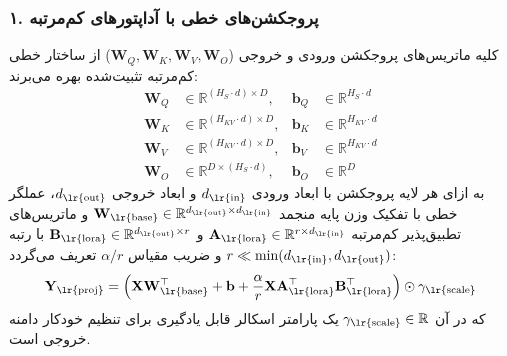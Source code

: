\subsubsection*{۱. پروجکشن‌های خطی با آداپتورهای کم‌مرتبه }
کلیه ماتریس‌های پروجکشن ورودی و خروجی ($\mathbf{W}_Q, \mathbf{W}_K, \mathbf{W}_V, \mathbf{W}_O$) از ساختار خطی کم‌مرتبه تثبیت‌شده بهره می‌برند:
\begin{align}
\mathbf{W}_Q &\in \mathbb{R}^{(H_S \cdot d) \times D}, & \mathbf{b}_Q &\in \mathbb{R}^{H_S \cdot d} \\
\mathbf{W}_K &\in \mathbb{R}^{(H_{KV} \cdot d) \times D}, & \mathbf{b}_K &\in \mathbb{R}^{H_{KV} \cdot d} \\
\mathbf{W}_V &\in \mathbb{R}^{(H_{KV} \cdot d) \times D}, & \mathbf{b}_V &\in \mathbb{R}^{H_{KV} \cdot d} \\
\mathbf{W}_O &\in \mathbb{R}^{D \times (H_S \cdot d)}, & \mathbf{b}_O &\in \mathbb{R}^{D}
\end{align}
به ازای هر لایه پروجکشن با ابعاد ورودی $d_{\text{\lr{in}}}$ و ابعاد خروجی $d_{\text{\lr{out}}}$، عملگر خطی با تفکیک وزن پایه منجمد $\mathbf{W}_{\text{\lr{base}}} \in \mathbb{R}^{d_{\text{\lr{out}}} \times d_{\text{\lr{in}}}}$ و ماتریس‌های تطبیق‌پذیر کم‌مرتبه $\mathbf{A}_{\text{\lr{lora}}} \in \mathbb{R}^{r \times d_{\text{\lr{in}}}}$ و $\mathbf{B}_{\text{\lr{lora}}} \in \mathbb{R}^{d_{\text{\lr{out}}} \times r}$ با رتبه $r \ll \min(d_{\text{\lr{in}}}, d_{\text{\lr{out}}})$ و ضریب مقیاس $\alpha / r$ تعریف می‌گردد:
\begin{equation}
\mathbf{Y}_{\text{\lr{proj}}} = \left( \mathbf{X} \mathbf{W}_{\text{\lr{base}}}^\top + \mathbf{b} + \frac{\alpha}{r} \mathbf{X} \mathbf{A}_{\text{\lr{lora}}}^\top \mathbf{B}_{\text{\lr{lora}}}^\top \right) \odot \gamma_{\text{\lr{scale}}}
\end{equation}
که در آن $\gamma_{\text{\lr{scale}}} \in \mathbb{R}$ یک پارامتر اسکالر قابل یادگیری برای تنظیم خودکار دامنه خروجی است.

